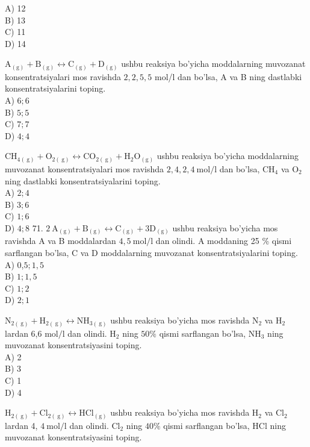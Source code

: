A) 12\\
B) 13\\
C) 11\\
D) 14
  \item $\mathrm{A}_{(\mathrm{g})}+\mathrm{B}_{(\mathrm{g})} \leftrightarrow \mathrm{C}_{(\mathrm{g})}+\mathrm{D}_{(\mathrm{g})}$ ushbu reaksiya bo'yicha moddalarning muvozanat konsentratsiyalari mos ravishda $2,2,5,5$ mol/l dan bo'lsa, A va B ning dastlabki konsentratsiyalarini toping.\\
A) $6 ; 6$\\
B) $5 ; 5$\\
C) $7 ; 7$\\
D) $4 ; 4$
  \item $\mathrm{CH}_{4(\mathrm{~g})}+\mathrm{O}_{2(\mathrm{~g})} \leftrightarrow \mathrm{CO}_{2(\mathrm{~g})}+\mathrm{H}_{2} \mathrm{O}_{(\mathrm{g})}$ ushbu reaksiya bo'yicha moddalarning muvozanat konsentratsiyalari mos ravishda $2,4,2,4 \mathrm{~mol} / \mathrm{l}$ dan bo'lsa, $\mathrm{CH}_{4}$ va $\mathrm{O}_{2}$ ning dastlabki konsentratsiyalarini toping.\\
A) $2 ; 4$\\
B) $3 ; 6$\\
C) $1 ; 6$\\
D) $4 ; 8$
71. $2 \mathrm{~A}_{(\mathrm{g})}+\mathrm{B}_{(\mathrm{g})} \leftrightarrow \mathrm{C}_{(\mathrm{g})}+3 \mathrm{D}_{(\mathrm{g})}$ ushbu reaksiya bo'yicha mos ravishda A va B moddalardan $4,5 \mathrm{~mol} / \mathrm{l}$ dan olindi. A moddaning 25 \% qismi sarflangan bo'lsa, C va D moddalarning muvozanat konsentratsiyalarini toping.\\
A) 0,$5 ; 1,5$\\
B) $1 ; 1,5$\\
C) $1 ; 2$\\
D) $2 ; 1$
  \item $\mathrm{N}_{2(\mathrm{~g})}+\mathrm{H}_{2(\mathrm{~g})} \leftrightarrow \mathrm{NH}_{3(\mathrm{~g})}$ ushbu reaksiya bo'yicha mos ravishda $\mathrm{N}_{2}$ va $\mathrm{H}_{2}$ lardan 6,6 $\mathrm{mol} / \mathrm{l}$ dan olindi. $\mathrm{H}_{2}$ ning $50 \%$ qismi sarflangan bo'lsa, $\mathrm{NH}_{3}$ ning muvozanat konsentratsiyasini toping.\\
A) 2\\
B) 3\\
C) 1\\
D) 4
  \item $\mathrm{H}_{2(\mathrm{~g})}+\mathrm{Cl}_{2(\mathrm{~g})} \leftrightarrow \mathrm{HCl}_{(\mathrm{g})}$ ushbu reaksiya bo'yicha mos ravishda $\mathrm{H}_{2}$ va $\mathrm{Cl}_{2}$ lardan 4, $4 \mathrm{~mol} / \mathrm{l}$ dan olindi. $\mathrm{Cl}_{2}$ ning $40 \%$ qismi sarflangan bo'lsa, HCl ning muvozanat konsentratsiyasini toping.\\
